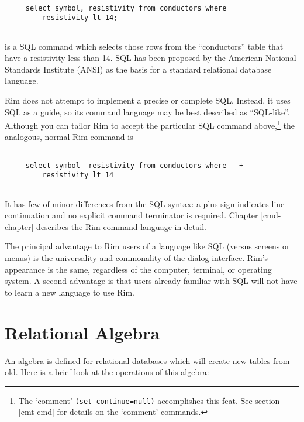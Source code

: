 \begin{verbatim}
 
     select symbol, resistivity from conductors where
         resistivity lt 14;
 
\end{verbatim}
 
\noindent
is a SQL command which selects those rows from the ``conductors''
table that have a resistivity less than 14.
SQL has been proposed by the American National Standards Institute (ANSI)
as the basis for a standard relational database language.
 
 
Rim does not attempt to implement a precise or complete SQL.
Instead, it uses SQL as a guide, so its command language
may be best described as ``SQL-like''.
Although you can tailor Rim to accept the particular
SQL command above,\footnote{The `comment' {\tt  *(set continue=null)}
 accomplishes this feat. See section \ref{cmt-cmd}
 for details on the `comment' commands.}
 the analogous, normal Rim command is
 
\begin{verbatim}
 
     select symbol  resistivity from conductors where   +
         resistivity lt 14
 
\end{verbatim}
 
\noindent
It has few of minor differences from the SQL syntax:
a plus sign
indicates line continuation and no explicit command terminator is required.
Chapter \ref{cmd-chapter} describes the Rim command language
in detail.
 
The principal advantage to Rim users of a language like SQL
(versus screens or menus) is the universality
and commonality of the dialog interface.  Rim's appearance
is the same, regardless of the computer, terminal, or operating
system.
A second advantage is that users already familiar with
SQL will not have to learn a new language to use Rim.
 
\section{Relational Algebra}
 
An algebra is defined for relational databases which will
create new tables from old.  Here is a brief look
at the operations of this algebra:
 
